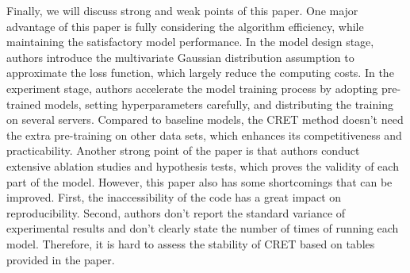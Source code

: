 \documentclass{article}
\begin{document}
Finally, we will discuss strong and weak points of this paper. One major advantage of this paper is fully considering the algorithm efficiency, while maintaining the satisfactory model performance. In the model design stage, authors introduce the multivariate Gaussian distribution assumption to approximate the loss function, which largely reduce the computing costs. In the experiment stage, authors accelerate the model training process by adopting pre-trained models, setting hyperparameters carefully, and distributing the training on several servers. Compared to baseline models, the CRET method doesn't need the extra pre-training on other data sets, which enhances its competitiveness and practicability. Another strong point of the paper is that authors conduct extensive ablation studies and hypothesis tests, which proves the validity of each part of the model. However, this paper also has some shortcomings that can be improved. First, the inaccessibility of the code has a great impact on reproducibility. Second, authors don't report the standard variance of experimental results and don't clearly state the number of times of running each model. Therefore, it is hard to assess the stability of CRET based on tables provided in the paper.


\end{document}
